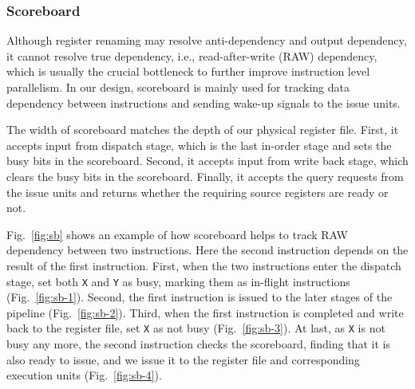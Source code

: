 \subsubsection{Scoreboard} %
Although register renaming may resolve anti-dependency and output dependency, it cannot resolve true dependency, i.e., read-after-write (RAW) dependency, which is usually the crucial bottleneck to further improve instruction level parallelism. In our design, scoreboard is mainly used for tracking data dependency between instructions and sending wake-up signals to the issue units.

The width of scoreboard matches the depth of our physical register file. First, it accepts input from dispatch stage, which is the last in-order stage and sets the busy bits in the scoreboard. Second, it accepts input from write back stage, which clears the busy bits in the scoreboard. Finally, it accepts the query requests from the issue units and returns whether the requiring source registers are ready or not.

Fig.~\ref{fig:sb} shows an example of how scoreboard helps to track RAW dependency between two instructions. Here the second instruction depends on the result of the first instruction. First, when the two instructions enter the dispatch stage, set both \texttt{X} and \texttt{Y} as busy, marking them as in-flight instructions (Fig.~\ref{fig:sb-1}). Second, the first instruction is issued to the later stages of the pipeline (Fig.~\ref{fig:sb-2}). Third, when the first instruction is completed and write back to the register file, set \texttt{X} as not busy (Fig.~\ref{fig:sb-3}). At last, as \texttt{X} is not busy any more, the second instruction checks the scoreboard, finding that it is also ready to issue, and we issue it to the register file and corresponding execution units (Fig.~\ref{fig:sb-4}).

